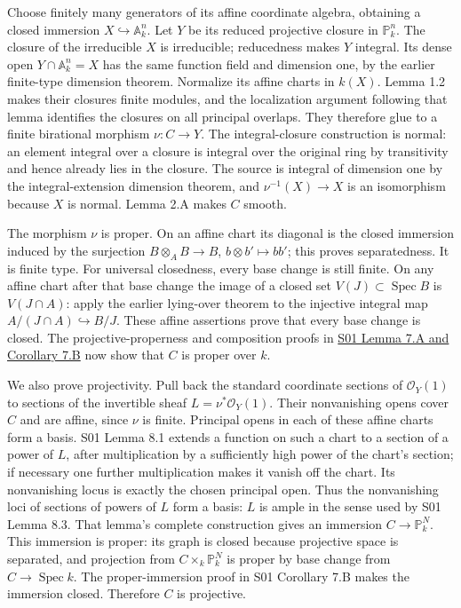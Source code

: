 \documentclass[11pt,a4paper,openany]{report}
\begin{document}
Choose finitely many generators of its affine coordinate algebra, obtaining a closed immersion \(X\hookrightarrow\mathbb A^n_k\). Let \(Y\) be its reduced projective closure in \(\mathbb P^n_k\). The closure of the irreducible \(X\) is irreducible; reducedness makes \(Y\) integral. Its dense open \(Y\cap\mathbb A^n_k=X\) has the same function field and dimension one, by the earlier finite-type dimension theorem. Normalize its affine charts in \(k(X)\). Lemma 1.2 makes their closures finite modules, and the localization argument following that lemma identifies the closures on all principal overlaps. They therefore glue to a finite birational morphism \(\nu:C\to Y\). The integral-closure construction is normal: an element integral over a closure is integral over the original ring by transitivity and hence already lies in the closure. The source is integral of dimension one by the integral-extension dimension theorem, and \(\nu^{-1}(X)\to X\) is an isomorphism because \(X\) is normal. Lemma 2.A makes \(C\) smooth.

The morphism \(\nu\) is proper. On an affine chart its diagonal is the closed immersion induced by the surjection \(B\otimes_A B\to B\), \(b\otimes b'\mapsto bb'\); this proves separatedness. It is finite type. For universal closedness, every base change is still finite. On any affine chart after that base change the image of a closed set \(V(J)\subset\operatorname{Spec}B\) is \(V(J\cap A)\): apply the earlier lying-over theorem to the injective integral map \(A/(J\cap A)\hookrightarrow B/J\). These affine assertions prove that every base change is closed. The projective-properness and composition proofs in \href{AG-RG-S01.html\#projective-properness}{S01 Lemma 7.A and Corollary 7.B} now show that \(C\) is proper over \(k\).

We also prove projectivity. Pull back the standard coordinate sections of \(\mathcal O_Y(1)\) to sections of the invertible sheaf \(L=\nu^*\mathcal O_Y(1)\). Their nonvanishing opens cover \(C\) and are affine, since \(\nu\) is finite. Principal opens in each of these affine charts form a basis. S01 Lemma 8.1 extends a function on such a chart to a section of a power of \(L\), after multiplication by a sufficiently high power of the chart's section; if necessary one further multiplication makes it vanish off the chart. Its nonvanishing locus is exactly the chosen principal open. Thus the nonvanishing loci of sections of powers of \(L\) form a basis: \(L\) is ample in the sense used by S01 Lemma 8.3. That lemma's complete construction gives an immersion \(C\to\mathbb P^N_k\). This immersion is proper: its graph is closed because projective space is separated, and projection from \(C\times_k\mathbb P^N_k\) is proper by base change from \(C\to\operatorname{Spec}k\). The proper-immersion proof in S01 Corollary 7.B makes the immersion closed. Therefore \(C\) is projective.
\end{document}
